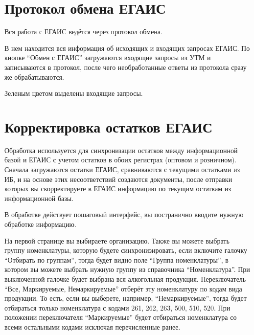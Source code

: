 \documentclass[letterpaper,10pt,russian]{sphinxmanual}
\begin{document}
\chapter{Протокол обмена ЕГАИС}
\label{exprot::doc}\label{exprot:id1}
Вся работа с ЕГАИС ведётся через протокол обмена.
\begin{figure}[htbp]
\centering

\noindent{}
\end{figure}

В нем находится вся информация об исходящих и входящих запросах ЕГАИС.
По кнопке ``Обмен с ЕГАИС'' загружаются входящие запросы из УТМ и записываются в протокол, после чего необработанные ответы из протокола сразу же обрабатываются.

Зеленым цветом выделены входящие запросы.


\chapter{Корректировка остатков ЕГАИС}
\label{korost::doc}\label{korost:id1}
Обработка используется для синхронизации остатков между информационной базой и ЕГАИС с учетом остатков в обоих регистрах (оптовом и розничном). Сначала загружаются остатки ЕГАИС, сравниваются с текущими остатками из ИБ, и на основе этих несоответствий создаются документы, после отправки которых вы скорректируете в ЕГАИС информацию по текущим остаткам из информационной базы.

В обработке действует пошаговый интерфейс, вы постранично вводите нужную обработке информацию.
\begin{figure}[htbp]
\centering

\noindent{}
\end{figure}

На первой странице вы выбираете организацию. Также вы можете выбрать группу номенклатуры, которую будете синхронизировать, если включите галочку ``Отбирать по группам'', тогда будет видно поле ``Группа номенклатуры'', в котором вы можете выбрать нужную группу из справочника ``Номенклатура''. При выключенной галочке будет выбрана вся алкогольная продукция.
Переключатель ``Все, Маркируемые, Немаркируемые'' отберёт эту номенклатуру по кодам вида продукции. То есть, если вы выберете, например, ``Немаркируемые'', тогда будет отбираться только номенклатура с кодами 261, 262, 263, 500, 510, 520. При положении переключателя ``Маркируемые'' будет отбираться номенклатура со всеми остальными кодами исключая перечисленные ранее.
\end{document}
